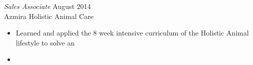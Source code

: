 \documentclass[margin]{res}
\begin{document}
\begin{resume}
  {\sl Sales Associate} \hfill August 2014 \\
  Azmira Holistic Animal Care
    \begin{itemize}
      \item Learned and applied the 8 week intensive curriculum of the Holistic Animal lifestyle to solve an
      \item 
     \end{itemize} 
 

 

\end{resume}
\end{document}
